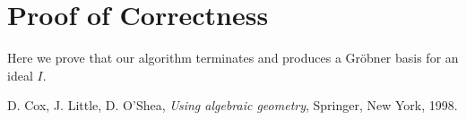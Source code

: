 \documentclass{amsart}
\theoremstyle{definition}
\theoremstyle{remark}
\numberwithin{equation}{section}
\newcommand{\<}{\langle}
\renewcommand{\>}{\rangle}
\begin{document}
\section{Proof of Correctness}\label{proofcorrect}

Here we prove that our algorithm terminates and 
produces a Gr\"obner basis for an ideal $I$.




\begin{thebibliography}{99}




 D. Cox, J. Little, D. O'Shea, \emph{Using algebraic geometry},
Springer, New York, 1998.


%
%




\end{thebibliography}
\end{document}
